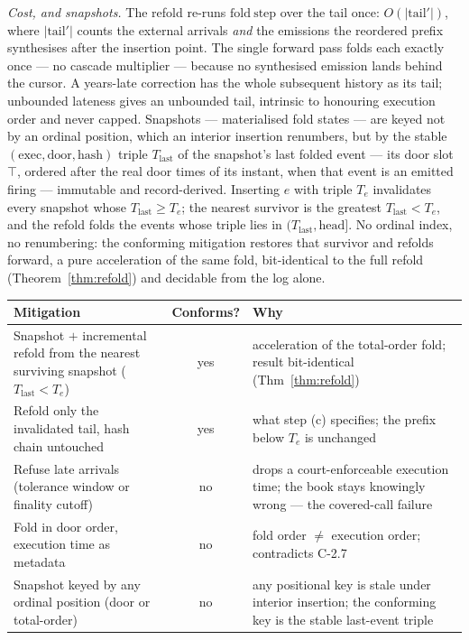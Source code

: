 \documentclass[11pt,a4paper]{article}
\begin{document}
\emph{Cost, and snapshots.} The refold re-runs $\mathrm{fold\ step}$ over the tail once:
$O(|\text{tail}'|)$, where $|\text{tail}'|$ counts the external arrivals \emph{and} the emissions
the reordered prefix synthesises after the insertion point. The single forward pass folds each
exactly once --- no cascade multiplier --- because no synthesised emission lands behind the
cursor. A years-late correction has the whole subsequent history as its tail; unbounded lateness
gives an unbounded tail, intrinsic to honouring execution order and never capped. Snapshots --- materialised fold states --- are keyed not by an ordinal
position, which an interior insertion renumbers, but by the stable $(\text{exec},\text{door},
\text{hash})$ triple $T_{\text{last}}$ of the snapshot's last folded event --- its door slot
$\top$, ordered after the real door times of its instant, when that event is an emitted firing --- immutable and record-derived. Inserting $e$ with triple $T_e$ invalidates every snapshot whose
$T_{\text{last}}\ge T_e$; the nearest survivor is the greatest $T_{\text{last}}<T_e$, and the
refold folds the events whose triple lies in $(T_{\text{last}},\text{head}]$. No ordinal index,
no renumbering: the conforming mitigation restores that survivor and refolds forward, a pure
acceleration of the same fold, bit-identical to the full refold (Theorem~\ref{thm:refold}) and
decidable from the log alone.

\begin{center}\small
\begin{tabular}{@{}p{6.3cm}cp{6.2cm}@{}}
\toprule
Mitigation & Conforms? & Why \\
\midrule
Snapshot $+$ incremental refold from the nearest surviving snapshot ($T_{\text{last}}<T_e$) & yes & acceleration of the total-order fold; result bit-identical (Thm~\ref{thm:refold}) \\
Refold only the invalidated tail, hash chain untouched & yes & what step (c) specifies; the prefix below $T_e$ is unchanged \\
Refuse late arrivals (tolerance window or finality cutoff) & no & drops a court-enforceable execution time; the book stays knowingly wrong --- the covered-call failure \\
Fold in door order, execution time as metadata & no & fold order $\ne$ execution order; contradicts C-2.7 \\
Snapshot keyed by any ordinal position (door or total-order) & no & any positional key is stale under interior insertion; the conforming key is the stable last-event triple \\
\bottomrule
\end{tabular}
\end{center}
\end{document}
